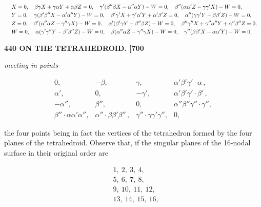 \documentclass[11pt]{article}
\begin{document}
\[
\resizebox{\textwidth}{!}{$\displaystyle
\begin{aligned}
&\ X = 0,\quad \beta\gamma X + \gamma\alpha Y + \alpha\beta Z = 0,\quad \gamma'(\beta''\beta X - \alpha''\alpha Y) - W = 0,\quad \beta''(\alpha\alpha' Z - \gamma\gamma' X) - W = 0, \\
&\ Y = 0,\quad \gamma(\beta'\beta'' X - \alpha'\alpha'' Y) - W = 0,\quad \beta'\gamma' X + \gamma'\alpha' Y + \alpha'\beta' Z = 0,\quad \alpha''(\gamma\gamma' Y - \beta\beta' Z) - W = 0, \\
&\ Z = 0,\quad \beta'(\alpha''\alpha Z - \gamma''\gamma X) - W = 0,\quad \alpha'(\beta'\gamma Y - \beta''\beta Z) - W = 0,\quad \beta''\gamma'' X + \gamma''\alpha'' Y + \alpha''\beta'' Z = 0, \\
&\ W = 0,\quad \alpha(\gamma'\gamma'' Y - \beta'\beta'' Z) - W = 0,\quad \beta(\alpha''\alpha Z - \gamma''\gamma X) - W = 0,\quad \gamma''(\beta\beta' X - \alpha\alpha' Y) - W = 0,
\end{aligned}
$}
\]

\bigskip
\noindent\textbf{440 \hfill ON THE TETRAHEDROID. \hfill [700}

\medskip

\begin{center}\textit{meeting in points}\end{center}

\[
\begin{array}{cccc}
0, & -\beta, & \gamma, & \alpha'\beta'\gamma'\cdot\alpha\,, \\
\alpha', & 0, & -\gamma', & \alpha'\beta'\gamma'\cdot\beta'\,, \\
-\alpha'', & \beta'', & 0, & \alpha''\beta''\gamma''\cdot\gamma'', \\
\beta''\cdot\alpha\alpha'\alpha'', & \alpha''\cdot\beta\beta'\beta''\,, & \gamma''\cdot\gamma\gamma'\gamma'', & 0,
\end{array}
\]

the four points being in fact the vertices of the tetrahedron formed by the four planes of the tetrahedroid. Observe that, if the singular planes of the 16-nodal surface in their original order are

\[
\begin{aligned}
& 1,\ 2,\ 3,\ 4, \\
& 5,\ 6,\ 7,\ 8, \\
& 9,\ 10,\ 11,\ 12, \\
& 13,\ 14,\ 15,\ 16,
\end{aligned}
\]
\end{document}
